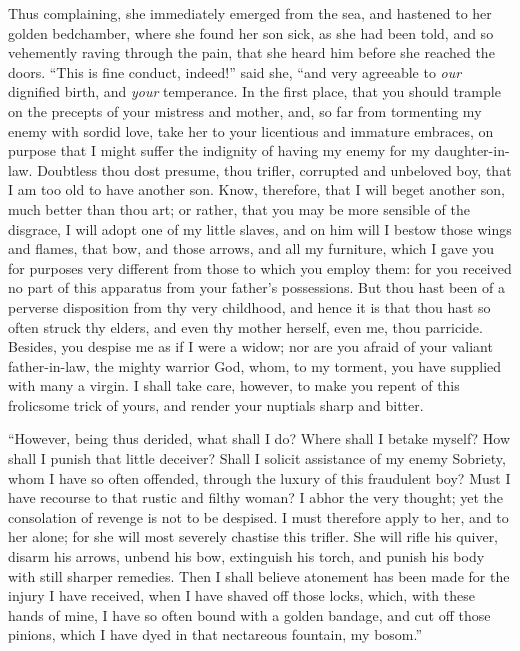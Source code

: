 \documentclass{article}
\begin{document}
Thus complaining, she immediately emerged from the sea, and hastened to her
golden bedchamber, where she found her son sick, as she had been told, and so
vehemently raving through the pain, that she heard him before she reached the
doors. ``This is fine conduct, indeed!'' said she, ``and very agreeable to
\textit{our} dignified birth, and \textit{your} temperance. In the first place,
that you should trample on the precepts of your mistress and mother, and, so
far from tormenting my enemy with sordid love, take her to your licentious and
immature embraces, on purpose that I might suffer the indignity of having my
enemy for my daughter-in-law. Doubtless thou dost presume, thou trifler,
corrupted and unbeloved boy, that I am too old to have another son. Know,
therefore, that I will beget another son, much better than thou art; or rather,
that you may be more sensible of the disgrace, I will adopt one of my little
slaves, and on him will I bestow those wings and flames, that bow, and those
arrows, and all my furniture, which I gave you for purposes very different from
those to which you employ them: for you received no part of this apparatus from
your father's possessions. But thou hast been of a perverse disposition from
thy very childhood, and hence it is that thou hast so often struck thy elders,
and even thy mother herself, even me, thou parricide. Besides, you despise me
as if I were a widow; nor are you afraid of your valiant father-in-law, the
mighty warrior God, whom, to my torment, you have supplied with many a virgin.
I shall take care, however, to make you repent of this frolicsome trick of
yours, and render your nuptials sharp and bitter.

``However, being thus derided, what shall I do? Where shall I betake myself?
How shall I punish that little deceiver? Shall I solicit assistance of my enemy
Sobriety, whom I have so often offended, through the luxury of this fraudulent
boy? Must I have recourse to that rustic and filthy woman? I abhor the very
thought; yet the consolation of revenge is not to be despised. I must therefore
apply to her, and to her alone; for she will most severely chastise this
trifler. She will rifle his quiver, disarm his arrows, unbend his bow,
extinguish his torch, and punish his body with still sharper remedies. Then I
shall believe atonement has been made for the injury I have received, when I
have shaved off those locks, which, with these hands of mine, I have so often
bound with a golden bandage, and cut off those pinions, which I have dyed in
that nectareous fountain, my bosom.''
\end{document}
